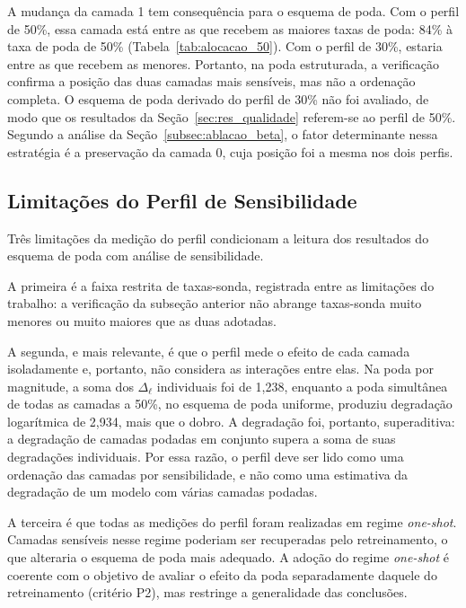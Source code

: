 A mudança da camada 1 tem consequência para o esquema de poda. Com o perfil de 50\%, essa
camada está entre as que recebem as maiores taxas de poda: 84\% à taxa de poda de 50\%
(Tabela~\ref{tab:alocacao_50}). Com o perfil de 30\%, estaria entre as que recebem as menores.
Portanto, na poda estruturada, a verificação confirma a posição das duas camadas mais
sensíveis, mas não a ordenação completa. O esquema de poda derivado do perfil de 30\% não foi
avaliado, de modo que os resultados da Seção~\ref{sec:res_qualidade} referem-se ao perfil de
50\%. Segundo a análise da Seção~\ref{subsec:ablacao_beta}, o fator determinante nessa
estratégia é a preservação da camada 0, cuja posição foi a mesma nos dois perfis.

\subsection{Limitações do Perfil de Sensibilidade}\label{subsec:limitacoes_perfil}

Três limitações da medição do perfil condicionam a leitura dos resultados do esquema de poda
com análise de sensibilidade.

A primeira é a faixa restrita de taxas-sonda, registrada entre as limitações do trabalho:
a verificação da subseção anterior não abrange taxas-sonda muito
menores ou muito maiores que as duas adotadas.

A segunda, e mais relevante, é que o perfil mede o efeito de cada camada isoladamente e,
portanto, não considera as interações entre elas. Na poda por magnitude, a soma dos
$\Delta_{\ell}$ individuais foi de 1,238, enquanto a poda simultânea de todas as camadas a
50\%, no esquema de poda uniforme, produziu degradação logarítmica de 2,934, mais que o dobro.
A degradação foi, portanto, superaditiva: a degradação de camadas podadas em conjunto supera a
soma de suas degradações individuais. Por essa razão, o perfil deve ser lido como uma ordenação
das camadas por sensibilidade, e não como uma estimativa da degradação de um modelo com várias
camadas podadas.

A terceira é que todas as medições do perfil foram realizadas em regime \textit{one-shot}.
Camadas sensíveis nesse regime poderiam ser recuperadas pelo retreinamento, o que alteraria o
esquema de poda mais adequado. A adoção do regime \textit{one-shot} é coerente com o objetivo
de avaliar o efeito da poda separadamente daquele do retreinamento (critério P2),
mas restringe a generalidade das
conclusões.

